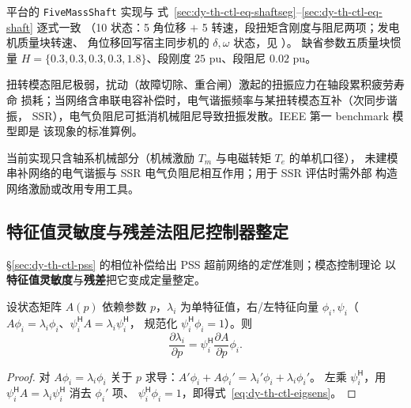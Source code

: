 \begin{remark}[实现口径与边界]
平台的 \texttt{FiveMassShaft} 实现与
式~\eqref{sec:dy-th-ctl-eq-shaftseg}--\eqref{sec:dy-th-ctl-eq-shaft} 逐式一致
（10 状态：5 角位移 $+$ 5 转速，段扭矩含刚度与阻尼两项；发电机质量块转速、
角位移回写宿主同步机的 $\delta,\omega$ 状态，见
）。
缺省参数五质量块惯量 $H=\{0.3,0.3,0.3,0.3,1.8\}$、段刚度 $25$ pu、段阻尼
$0.02$ pu。
\end{remark}

\begin{remark}
扭转模态阻尼极弱，扰动（故障切除、重合闸）激起的扭振应力在轴段累积疲劳寿命
损耗；当网络含串联电容补偿时，电气谐振频率与某扭转模态互补（次同步谐振，
SSR），电气负阻尼可抵消机械阻尼导致扭振发散。IEEE 第一 benchmark 模型即是
该现象的标准算例。
\end{remark}

\begin{gapnote}
当前实现只含轴系机械部分（机械激励 $T_m$ 与电磁转矩 $T_e$ 的单机口径），
未建模串补网络的电气谐振与 SSR 电气负阻尼相互作用；用于 SSR 评估时需外部
构造网络激励或改用专用工具。
\end{gapnote}

\subsection{特征值灵敏度与残差法阻尼控制器整定}\label{sec:dy-th-ctl-residue}

§\ref{sec:dy-th-ctl-pss} 的相位补偿给出 PSS 超前网络的\emph{定性}准则；模态控制理论
以\textbf{特征值灵敏度}与\textbf{残差}把它变成定量整定。

\begin{proposition}[特征值对参数的灵敏度]\label{prop:dy-th-ctl-eigsens}
设状态矩阵 $A(p)$ 依赖参数 $p$，$\lambda_i$ 为单特征值，右/左特征向量
$\phi_i,\psi_i$（$A\phi_i=\lambda_i\phi_i$、$\psi_i^{\mathsf H}A=\lambda_i\psi_i^{\mathsf H}$，
规范化 $\psi_i^{\mathsf H}\phi_i=1$）。则
\begin{equation}
\frac{\partial\lambda_i}{\partial p}=\psi_i^{\mathsf H}\frac{\partial A}{\partial p}\phi_i .
\label{eq:dy-th-ctl-eigsens}
\end{equation}
\end{proposition}
\begin{proof}
对 $A\phi_i=\lambda_i\phi_i$ 关于 $p$ 求导：$A'\phi_i+A\phi_i'=\lambda_i'\phi_i+\lambda_i\phi_i'$。
左乘 $\psi_i^{\mathsf H}$，用 $\psi_i^{\mathsf H}A=\lambda_i\psi_i^{\mathsf H}$ 消去 $\phi_i'$ 项、
$\psi_i^{\mathsf H}\phi_i=1$，即得式~\eqref{eq:dy-th-ctl-eigsens}。
\end{proof}

